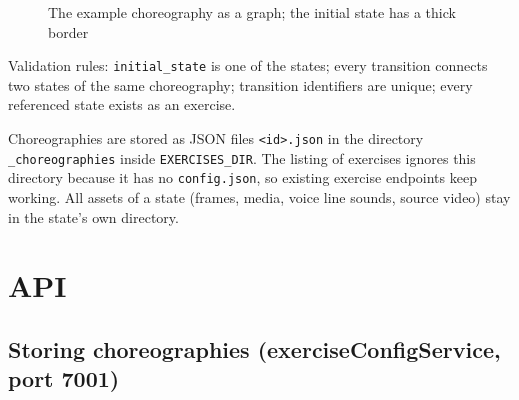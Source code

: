 \documentclass[12pt,a4paper]{article}
\begin{document}
\begin{figure}[H]
    \centering
    \caption{The example choreography as a graph; the initial state has a thick border}
    \label{fig:graph}
\end{figure}

Validation rules: \texttt{initial\_state} is one of the states; every
transition connects two states of the same choreography; transition
identifiers are unique; every referenced state exists as an exercise.

Choreographies are stored as JSON files
\texttt{<id>.json} in the directory \texttt{\_choreographies} inside \texttt{EXERCISES\_DIR}. The listing of exercises
ignores this directory because it has no \texttt{config.json}, so existing
exercise endpoints keep working. All assets of a state (frames, media,
voice line sounds, source video) stay in the state's own directory.


\section{API}

\subsection{Storing choreographies (exerciseConfigService, port 7001)}
\end{document}
